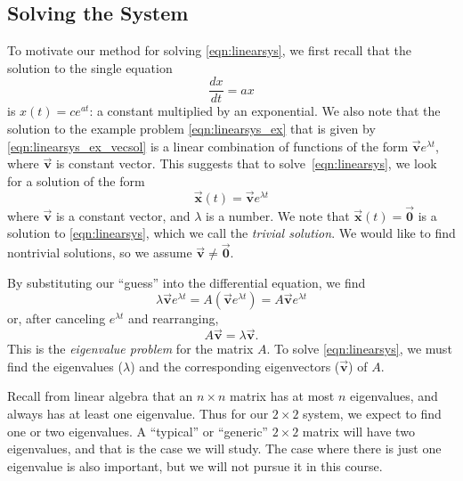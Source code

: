 \documentclass[reqno]{immbook}
\newcommand{\BV}{\vec{\textbf{v}}}
\newcommand{\BX}{\vec{\textbf{x}}}
\newcommand{\BZero}{\vec{\textbf{0}}}  %
\numberwithin{equation}{chapter}
\numberwithin{question}{section}
\numberwithin{theorem}{chapter}
\numberwithin{figure}{chapter}
\theoremstyle{definition}
\begin{document}
\subsection*{Solving the System}
To motivate our method for
solving \eqref{eqn:linearsys},
we first recall that the solution to the
single equation
\begin{equation}
  \frac{dx}{dt} = a x
\end{equation}
is $x(t) = c e^{at}$: a constant multiplied by
an exponential.  We also 
note that the solution to
the example problem \eqref{eqn:linearsys_ex} that is given
by \eqref{eqn:linearsys_ex_vecsol} is a linear combination of functions
of the form $\BV e^{\lambda t}$, where $\BV$ is constant vector.
This suggests that to solve~\eqref{eqn:linearsys},
we look for a solution of the form
\begin{equation}
  \BX(t) = \BV e^{\lambda t}
\end{equation}
where $\BV$ is a constant vector, and $\lambda$ is a number.
We note that $\BX(t) = \BZero$ is a solution to \eqref{eqn:linearsys},
which we call the \emph{trivial solution}.
We would like to
find nontrivial solutions, so we assume $\BV\ne \BZero$.

By substituting our ``guess'' into the differential equation, we
find
\begin{equation}
  \lambda \BV e^{\lambda t} = A\left(\BV e^{\lambda t}\right)
       = A\BV e^{\lambda t}
\end{equation}
or, after canceling $e^{\lambda t}$ and rearranging,
\begin{equation}
   A\BV = \lambda \BV.
\label{eqn:eigenvalueprob}
\end{equation}
This is the \emph{eigenvalue problem}
for the matrix $A$.
To solve \eqref{eqn:linearsys}, we must find
the eigenvalues ($\lambda$) and
the corresponding eigenvectors ($\BV$) of $A$.

Recall from linear algebra that an $n\times n$ matrix
has at most $n$ eigenvalues, and always has at least
one eigenvalue.  Thus for our $2\times 2$
system, we expect to find one or two eigenvalues.
A ``typical'' or ``generic'' $2\times 2$ matrix
will have two eigenvalues, and that is the case
we will study.  The case where there is just one
eigenvalue is also important, but we will not pursue
it in this course.
\end{document}
